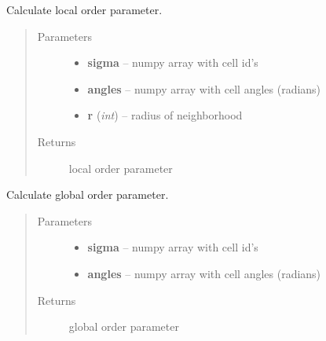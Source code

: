 \documentclass[letterpaper,10pt,english]{sphinxmanual}
\begin{document}
\begin{fulllineitems}
\label{AnalysisUtils:AnalysisUtils.getLocalOrderParameter}
Calculate local order parameter.
\begin{quote}\begin{description}
\item[{Parameters}] \leavevmode\begin{itemize}
\item {} 
\textbf{sigma} -- numpy array with cell id's

\item {} 
\textbf{angles} -- numpy array with cell angles (radians)

\item {} 
\textbf{r} (\emph{int}) -- radius of neighborhood

\end{itemize}

\item[{Returns}] \leavevmode
local order parameter

\end{description}\end{quote}




{\hyperref[AnalysisUtils:AnalysisUtils.getDirector]{}}



\end{fulllineitems}


\begin{fulllineitems}
\label{AnalysisUtils:AnalysisUtils.getGlobalOrderParameter}
Calculate global order parameter.
\begin{quote}\begin{description}
\item[{Parameters}] \leavevmode\begin{itemize}
\item {} 
\textbf{sigma} -- numpy array with cell id's

\item {} 
\textbf{angles} -- numpy array with cell angles (radians)

\end{itemize}

\item[{Returns}] \leavevmode
global order parameter

\end{description}\end{quote}

\end{fulllineitems}
\end{document}
